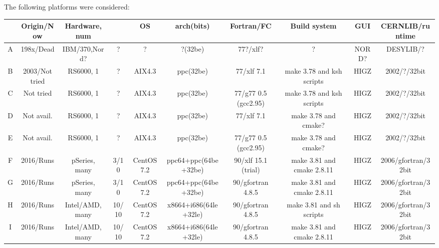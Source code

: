 The following platforms were considered:
\setlength{\tabcolsep}{0.0em}
\begin{sidewaystable}[htbp]\scriptsize\centering
\begin{tabular}{|c|c|c|c|c|c|c|c|c|c|}\hline
    & Origin/Now        & Hardware, num               &        &OS             & arch(bits)               & Fortran/FC                &Build system              &GUI      & CERNLIB/runtime  \\\hline\hline
A   & 198x/Dead         &  IBM/370,Nord?              & ?      &?              &   ?(32be)                & 77?/xlf?                  &?                         &NORD? & DESYLIB/?     \\
B   & 2003/Not tried    &  RS6000, 1                  & ?      &AIX4.3         & ppc(32be)                & 77/xlf 7.1                &make 3.78 and ksh scripts &HIGZ  & 2002/?/32bit     \\
C   &      Not tried    &  RS6000, 1                  & ?      &AIX4.3         & ppc(32be)                & 77/g77 0.5 (gcc2.95)      &make 3.78 and ksh scripts &HIGZ      & 2002/?/32bit     \\
D   &      Not avail.   &  RS6000, 1                  & ?      &AIX4.3         & ppc(32be)                & 77/xlf 7.1                &make 3.78 and cmake?      &HIGZ      & 2002/?/32bit     \\
E   &      Not avail.   &  RS6000, 1                  & ?      &AIX4.3         & ppc(32be)                & 77/g77 0.5 (gcc2.95)      &make 3.78 and cmake?      &HIGZ      & 2002/?/32bit     \\
F   & 2016/Runs         &  pSeries\@QEMU2.7, many   & 3/10   &CentOS7.2 & ppc64+ppc(64be+32be)     & 90/xlf 15.1 (trial)       &make 3.81 and cmake 2.8.11       &HIGZ      & 2006/gfortran/32bit     \\
G   & 2016/Runs         &  pSeries\@QEMU2.7, many   & 3/10   &CentOS7.2 & ppc64+ppc(64be+32be)     & 90/gfortran 4.8.5         &make 3.81 and cmake 2.8.11       &HIGZ      & 2006/gfortran/32bit     \\
H   & 2016/Runs         &  Intel/AMD, many            &10/10   &CentOS7.2 & x8664+i686(64le+32le)   & 90/gfortran 4.8.5         &make 3.81 and sh scripts        &HIGZ      & 2006/gfortran/32bit     \\
I   & 2016/Runs         &  Intel/AMD, many            &10/10   &CentOS7.2 & x8664+i686(64le+32le)   & 90/gfortran 4.8.5         &make 3.81 and cmake 2.8.11      &HIGZ      & 2006/gfortran/32bit     \\

\end{tabular}
\end{sidewaystable}
